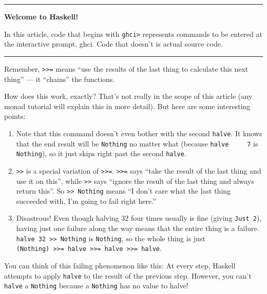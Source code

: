 \documentclass[]{article}
\begin{document}
\begin{center}\rule{0.5\linewidth}{0.5pt}\end{center}

\textbf{Welcome to Haskell!}

In this article, code that begins with \texttt{ghci\textgreater{}} represents
commands to be entered at the interactive prompt, ghci. Code that doesn't is
actual source code.

\begin{center}\rule{0.5\linewidth}{0.5pt}\end{center}

Remember, \texttt{\textgreater{}\textgreater{}=} means ``use the results of the
last thing to calculate this next thing'' --- it ``chains'' the functions.

How does this work, exactly? That's not really in the scope of this article (any
monad tutorial will explain this in more detail). But here are some interesting
points:

\begin{enumerate}
\def\labelenumi{\arabic{enumi}.}
\tightlist
\item
  Note that this command doesn't even bother with the second \texttt{halve}. It
  knows that the end result will be \texttt{Nothing} no matter what (because
  \texttt{halve\ \ \ \ \ 7} is \texttt{Nothing}), so it just skips right past
  the second \texttt{halve}.
\item
  \texttt{\textgreater{}\textgreater{}} is a special variation of
  \texttt{\textgreater{}\textgreater{}=}. \texttt{\textgreater{}\textgreater{}=}
  says ``take the result of the last thing and use it on this'', while
  \texttt{\textgreater{}\textgreater{}} says ``ignore the result of the last
  thing and always return this''. So
  \texttt{\textgreater{}\textgreater{}\ Nothing} means ``I don't care what the
  last thing succeeded with, I'm going to fail right here.''
\item
  Disastrous! Even though halving 32 four times usually is fine (giving
  \texttt{Just\ 2}), having just one failure along the way means that the entire
  thing is a failure. \texttt{halve\ 32\ \textgreater{}\textgreater{}\ Nothing}
  is \texttt{Nothing}, so the whole thing is just
  \texttt{(Nothing)\ \textgreater{}\textgreater{}=\ halve\ \textgreater{}\textgreater{}=\ halve\ \textgreater{}\textgreater{}=\ halve}.
\end{enumerate}

You can think of this failing phenomenon like this: At every step, Haskell
attempts to apply \texttt{halve} to the result of the previous step. However,
you can't \texttt{halve} a \texttt{Nothing} because a \texttt{Nothing} has no
value to halve!
\end{document}
